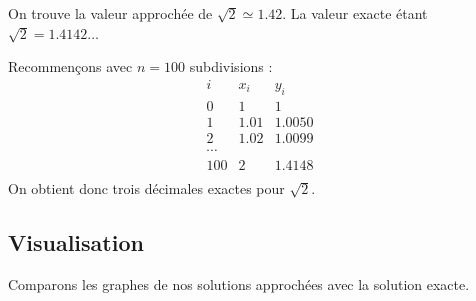 \documentclass[11pt,class=report,crop=false]{standalone}
\begin{document}
On trouve la valeur approchée de $\sqrt{2} \simeq 1.42$. La valeur exacte étant $\sqrt{2} = 1.4142\dots$


Recommençons avec $n=100$ subdivisions :
$$
\begin{array}{c|c|c}
i & x_i & y_i \\
\hline
0 & 1   & 1 \\
1 & 1.01 & 1.0050 \\
2 & 1.02 & 1.0099 \\
\cdots &  &  \\
100 & 2  & 1.4148 \\    
\end{array}$$
On obtient donc trois décimales exactes pour $\sqrt{2}$.


\subsection{Visualisation}

Comparons les graphes de nos solutions approchées avec la solution exacte.
\end{document}
